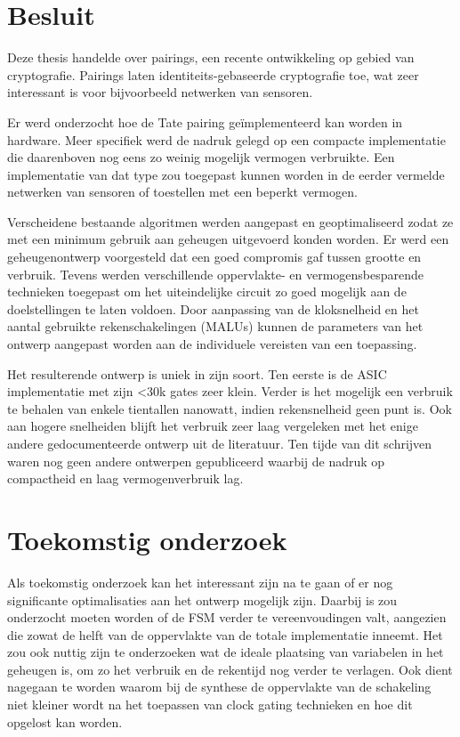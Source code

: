 
\section{Besluit}

Deze thesis handelde over pairings, een recente ontwikkeling op gebied van cryptografie. Pairings laten identiteits-gebaseerde cryptografie toe, wat zeer interessant is voor bijvoorbeeld netwerken van sensoren.

Er werd onderzocht hoe de Tate pairing ge\"implementeerd kan worden in hardware. Meer specifiek werd de nadruk gelegd op een compacte implementatie die daarenboven nog eens zo weinig mogelijk vermogen verbruikte. Een implementatie van dat type zou toegepast kunnen worden in de eerder vermelde netwerken van sensoren of toestellen met een beperkt vermogen.

Verscheidene bestaande algoritmen werden aangepast en geoptimaliseerd zodat ze met een minimum gebruik aan geheugen uitgevoerd konden worden. Er werd een geheugenontwerp voorgesteld dat een goed compromis gaf tussen grootte en verbruik. Tevens werden verschillende oppervlakte- en vermogensbesparende technieken toegepast om het uiteindelijke circuit zo goed mogelijk aan de doelstellingen te laten voldoen. Door aanpassing van de kloksnelheid en het aantal gebruikte rekenschakelingen (MALUs) kunnen de parameters van het ontwerp aangepast worden aan de individuele vereisten van een toepassing.

Het resulterende ontwerp is uniek in zijn soort. Ten eerste is de ASIC implementatie met zijn <30k gates zeer klein. Verder is het mogelijk een verbruik te behalen van enkele tientallen nanowatt, indien rekensnelheid geen punt is. Ook aan hogere snelheiden blijft het verbruik zeer laag vergeleken met het enige andere gedocumenteerde ontwerp uit de literatuur. Ten tijde van dit schrijven waren nog geen andere ontwerpen gepubliceerd waarbij de nadruk op compactheid en laag vermogenverbruik lag.

\section{Toekomstig onderzoek}

Als toekomstig onderzoek kan het interessant zijn na te gaan of er nog significante optimalisaties aan het ontwerp mogelijk zijn. Daarbij is zou onderzocht moeten worden of de FSM verder te vereenvoudingen valt, aangezien die zowat de helft van de oppervlakte van de totale implementatie inneemt. Het zou ook nuttig zijn te onderzoeken wat de ideale plaatsing van variabelen in het geheugen is, om zo het verbruik en de rekentijd nog verder te verlagen. Ook dient nagegaan te worden waarom bij de synthese de oppervlakte van de schakeling niet kleiner wordt na het toepassen van clock gating technieken en hoe dit opgelost kan worden.

